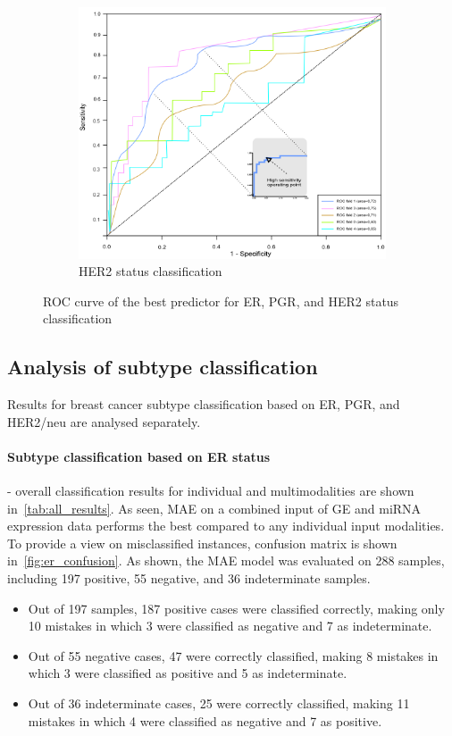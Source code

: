 \begin{figure}
\begin{subfigure}{0.49\linewidth}
		\includegraphics[width=0.9\linewidth]{images/roc_her2.png}
		\caption{HER2 status classification }
        \label{fig:her2_roc}
	\end{subfigure}
	\caption{ROC curve of the best predictor for ER, PGR, and HER2 status classification~\cite{karimACCESS2019}} 
	\label{fig:roc_all}
\end{figure}
\fi 

\subsection{Analysis of subtype classification}
Results for breast cancer subtype classification based on ER, PGR, and HER2/neu are analysed separately. 

\paragraph{Subtype classification based on ER status} - overall classification results for individual and multimodalities are shown in~\cref{tab:all_results}. As seen, MAE on a combined input of GE and miRNA expression data performs the best compared to any individual input modalities. To provide a view on misclassified instances, confusion matrix is shown in~\cref{fig:er_confusion}. As shown, the MAE model was evaluated on 288 samples, including 197 positive, 55 negative, and 36 indeterminate samples. 

\begin{itemize}[noitemsep]
    \item Out of 197 samples, 187 positive cases were classified correctly, making only 10 mistakes in which 3 were classified as negative and 7 as indeterminate. 

    \item Out of 55 negative cases, 47 were correctly classified, making 8 mistakes in which 3 were classified as positive and 5 as indeterminate. 

    \item Out of 36 indeterminate cases, 25 were correctly classified, making 11 mistakes in which 4 were classified as negative and 7 as positive.  
\end{itemize}

